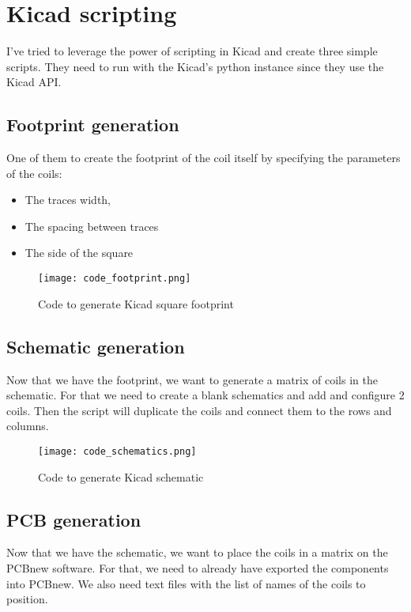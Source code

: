 \section{Kicad scripting}

I've tried to leverage the power of scripting in Kicad and create three simple scripts. They need to run with the Kicad's python instance since they use the Kicad API.

\subsection{Footprint generation}
One of them to create the footprint of the coil itself by specifying the parameters of the coils:

\begin{itemize}
	\item The traces width,
	\item The spacing between traces
	\item The side of the square
\end{itemize}

\begin{figure}[H]
	\centering
	\texttt{[image: code\_footprint.png]}
	\caption[Code to generate Kicad square footprint]{Code to generate Kicad square footprint}
	\label{fig:coil_footprint}
\end{figure}

\subsection{Schematic generation}
Now that we have the footprint, we want to generate a matrix of coils in the schematic. For that we need to create a blank schematics and add and configure 2 coils. Then the script will duplicate the coils and connect them to the rows and columns.

\begin{figure}[H]
	\centering
	\texttt{[image: code\_schematics.png]}
	\caption[Code to generate Kicad schematic]{Code to generate Kicad schematic}
	\label{fig:coil_schematic}
\end{figure}

\subsection{PCB generation}

Now that we have the schematic, we want to place the coils in a matrix on the PCBnew software. For that, we need to already have exported the components into PCBnew. We also need text files with the list of names of the coils to position.

